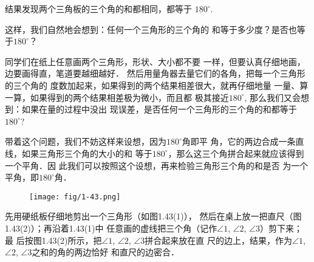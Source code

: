 结果发现两个三角板的三个角的和都相同，都等于
$180^{\circ}$.

\begin{figure}[htp]
	\centering
{}
	\caption{}
\end{figure}


这样，我们自然地会想到：任何一个三角形的三个角的
和等于多少度？是否也等于$180^{\circ}$？

同学们在纸上任意画两个三角形，形状、大小都不要
一样，但要认真仔细地画，边要画得直，笔道要越细越好．
然后用量角器去量它们的各角，把每一个三角形的三个角的
度数加起来，如果得到的两个结果相差很大，就再仔细地量
一量、算一算，如果得到的两个结果相差极为微小，而且都
极其接近$180^{\circ}$, 那么我们又会想到：如果在量的过程中没出
现误差，是否任何一个三角形的三个角的和都等于$180^{\circ}$?

带着这个问题，我们不妨这样来设想，因为$180^{\circ}$角即平
角，它的两边合成一条直线，如果三角形三个角的大小的和
等于$180^{\circ}$，那么这三个角拼合起来就应该得到一个平角．因
此我们可以按照这个设想，再来检验三角形三个角的和是否
为一个平角，即$180^{\circ}$角．

\begin{figure}[htp]
	\centering
\texttt{[image: fig/1-43.png]}
	\caption{}
\end{figure}

先用硬纸板仔细地剪出一个三角形（如图1.43(1)），
然后在桌上放一把直尺（图1.43(2)）；再沿着1.43(1)中
任意画的虚线把三个角（记作$\angle 1$, $\angle 2$, $\angle 3$）剪下来；最
后按图1.43(2)所示，把$\angle 1$, $\angle 2$, $\angle 3$拼合起来放在直
尺的边上，结果，作为$\angle 1$, $\angle 2$, $\angle 3$之和的角的两边恰好
和直尺的边密合．


